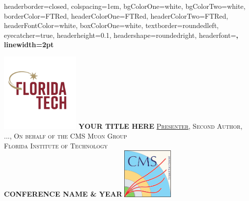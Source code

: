 \documentclass[landscape,a0paper,fontscale=0.42]{baposter} %
\begin{document}
\begin{poster}{
	headerborder=closed, %
	colspacing=1em, %
	bgColorOne=white, %
	bgColorTwo=white, %
	borderColor=FTRed, %
	headerColorOne=FTRed, %
	headerColorTwo=FTRed, %
	headerFontColor=white, %
	boxColorOne=white, %
	textborder=roundedleft, %
	eyecatcher=true, %
	headerheight=0.1\textheight, %
	headershape=roundedright, %
	headerfont=\Large\bf\textsc, %
	linewidth=2pt %
}


{\includegraphics[height=3.9cm]{FloridaTechNewLogo.png}} %
{\bf\textsc{\Huge{YOUR TITLE HERE}}} %
{\LARGE{\textsc{\underline{Presenter}, Second Author, ..., On behalf of the CMS Muon Group\\ Florida Institute of Technology}}\\

\textsc{\textbf{\textcolor{FTRed}{\Large{CONFERENCE NAME \& YEAR}}}}
} %
{\includegraphics[height=2.5cm]{CMS_logo_May2014.pdf}} %



\end{poster}
\end{document}
